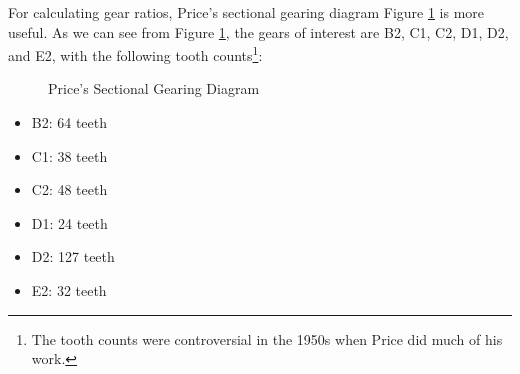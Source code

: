 \documentclass[11pt, oneside]{article}   	%
\theoremstyle{definition}
\begin{document}
\bigskip
\noindent
For calculating gear ratios,  Price's sectional gearing diagram Figure \ref{fig:sectional_gearing} is more useful. As we can see from Figure \ref{fig:sectional_gearing}, the gears of interest
are B2, C1, C2, D1, D2, and E2, with the following tooth counts\footnote{The tooth counts were controversial in the 1950s when Price did much of his work.}:

\newpage

\begin{figure}[H]
  \caption{Price's Sectional Gearing Diagram \cite{gears_from_the_greeks}}
  \label{fig:sectional_gearing}
\end{figure}
\bigskip
\bigskip
\bigskip
\begin{minipage}[c]{0.45\textwidth}
  \begin{itemize}
    \item B2: 64 teeth
    \item C1: 38 teeth
    \item C2: 48 teeth
    \item D1: 24 teeth
    \item D2: 127 teeth
    \item E2: 32 teeth
  \end{itemize}
\end{minipage}
\end{document}
